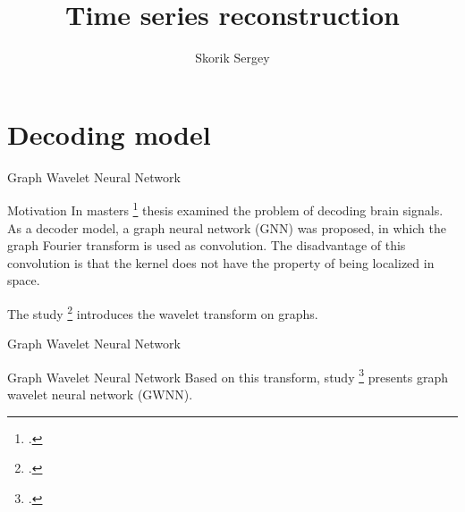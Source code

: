\documentclass{beamer}
\title{Time series reconstruction}
\author{Skorik Sergey}
\institute{MIPT, 2023}
\begin{document}
\begin{frame}
    \titlepage
\end{frame}

\begin{frame}
    \tableofcontents
\end{frame}

\section{Decoding model}
\begin{frame}{Graph Wavelet Neural Network}
    \begin{block}{Motivation}
        In masters \footcite{varenik2022} thesis examined the problem of decoding brain signals. As a decoder model, a graph neural network (GNN) was proposed, in which the graph Fourier transform is used as convolution. The disadvantage of this convolution is that the kernel does not have the property of being localized in space. 
        
        The study \footcite{hammond2011wavelets} introduces the wavelet transform on graphs.
    \end{block}
\end{frame}

\begin{frame}{Graph Wavelet Neural Network}
    \begin{block}{Graph Wavelet Neural Network}
        Based on this transform, study \footcite{xu2019graph} presents graph wavelet neural network (GWNN).
    \end{block}
\end{frame}
\end{document}
